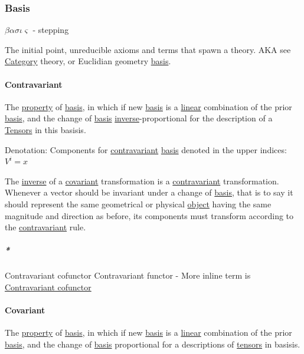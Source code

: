 \documentclass[a4paper,14pt,oneside]{book}
\begin{document}
\subsubsection{\label{org93d27e4}Basis}
\label{sec:org4c808c3}
\(\beta\alpha\sigma\iota\varsigma\) - stepping

The initial point, unreducible axioms and terms that spawn a theory.
AKA see \hyperref[orgea04b8d]{Category} theory, or Euclidian geometry \hyperref[org93d27e4]{basis}.

\paragraph{\label{orgf51c879}Contravariant}
\label{sec:orgded1902}
The \hyperref[org61434c5]{property} of \hyperref[org93d27e4]{basis}, in which if new \hyperref[org93d27e4]{basis} is a \hyperref[orgaeb051c]{linear} combination of the prior \hyperref[org93d27e4]{basis}, and the change of \hyperref[org93d27e4]{basis} \hyperref[org51cdbd8]{inverse}-proportional for the description of a \hyperref[org281c653]{Tensors} in this basisis.

Denotation:
Components for \hyperref[orgf51c879]{contravariant} \hyperref[org93d27e4]{basis} denoted in the upper indices:
\(V^{i} = x\)

The \hyperref[org51cdbd8]{inverse} of a \hyperref[org97bbf82]{covariant} transformation is a \hyperref[orgf51c879]{contravariant} transformation. Whenever a vector should be invariant under a change of \hyperref[org93d27e4]{basis}, that is to say it should represent the same geometrical or physical \hyperref[org48dcba4]{object} having the same magnitude and direction as before, its components must transform according to the \hyperref[orgf51c879]{contravariant} rule.

\subparagraph{\emph{*}}
\label{sec:org6974c8b}

\label{org2ecc15e}Contravariant cofunctor
\label{org0deddc8}Contravariant functor - More inline term is \hyperref[org2ecc15e]{Contravariant cofunctor}

\paragraph{\label{org97bbf82}Covariant}
\label{sec:orgd1c6493}
The \hyperref[org61434c5]{property} of \hyperref[org93d27e4]{basis}, in which if new \hyperref[org93d27e4]{basis} is a \hyperref[orgaeb051c]{linear} combination of the prior \hyperref[org93d27e4]{basis}, and the change of \hyperref[org93d27e4]{basis} proportional for a descriptions of \hyperref[org281c653]{tensors} in basisis.
\end{document}

